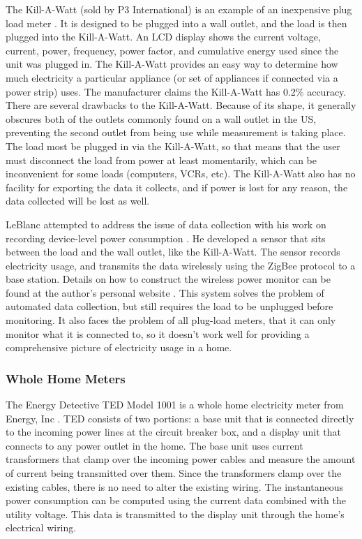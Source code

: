The Kill-A-Watt (sold by P3 International) is an example of an inexpensive plug load meter \cite{kill-a-watt}. It is designed to be plugged into a wall outlet, and the load is then plugged into the Kill-A-Watt. An LCD display shows the current voltage, current, power, frequency, power factor, and cumulative energy used since the unit was plugged in. The Kill-A-Watt provides an easy way to determine how much electricity a particular appliance (or set of appliances if connected via a power strip) uses. The manufacturer claims the Kill-A-Watt has 0.2\% accuracy. There are several drawbacks to the Kill-A-Watt. Because of its shape, it generally obscures both of the outlets commonly found on a wall outlet in the US, preventing the second outlet from being use while measurement is taking place. The load most be plugged in via the Kill-A-Watt, so that means that the user must disconnect the load from power at least momentarily, which can be inconvenient for some loads (computers, VCRs, etc). The Kill-A-Watt also has no facility for exporting the data it collects, and if power is lost for any reason, the data collected will be lost as well.

LeBlanc attempted to address the issue of data collection with his work on recording device-level power consumption \cite{leblanc-2007}. He developed a sensor that sits between the load and the wall outlet, like the Kill-A-Watt. The sensor records electricity usage, and transmits the data wirelessly using the ZigBee protocol to a base station. Details on how to construct the wireless power monitor can be found at the author's personal website \cite{LeBlanc2008power-mon-howto}. This system solves the problem of automated data collection, but still requires the load to be unplugged before monitoring. It also faces the problem of all plug-load meters, that it can only monitor what it is connected to, so it doesn't work well for providing a comprehensive picture of electricity usage in a home.

\subsubsection{Whole Home Meters}
\label{whole-home-meters}

The Energy Detective TED Model 1001 is a whole home electricity meter from Energy, Inc \cite{the-energy-detective}. TED consists of two portions: a base unit that is connected directly to the incoming power lines at the circuit breaker box, and a display unit that connects to any power outlet in the home. The base unit uses current transformers that clamp over the incoming power cables and measure the amount of current being transmitted over them. Since the transformers clamp over the existing cables, there is no need to alter the existing wiring. The instantaneous power consumption can be computed using the current data combined with the utility voltage. This data is transmitted to the display unit through the home's electrical wiring.

